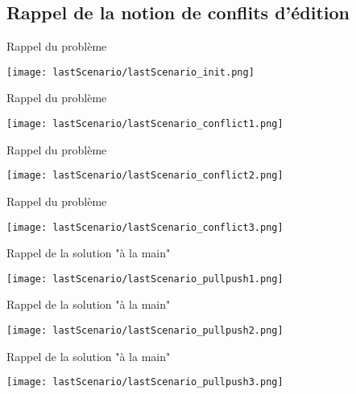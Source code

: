 \documentclass{beamer}
\begin{document}
\subsection{Rappel de la notion de conflits d'édition}
\begin{frame}{Rappel du problème}
\begin{center}
    \texttt{[image: lastScenario/lastScenario\_init.png]}
\end{center}
\end{frame}

\begin{frame}{Rappel du problème}
\begin{center}
    \texttt{[image: lastScenario/lastScenario\_conflict1.png]}
\end{center}
\end{frame}

\begin{frame}{Rappel du problème}
\begin{center}
    \texttt{[image: lastScenario/lastScenario\_conflict2.png]}
\end{center}
\end{frame}

\begin{frame}{Rappel du problème}
\begin{center}
    \texttt{[image: lastScenario/lastScenario\_conflict3.png]}
\end{center}
\end{frame}

\begin{frame}{Rappel de la solution "à la main"}
\begin{center}
    \texttt{[image: lastScenario/lastScenario\_pullpush1.png]}
\end{center}
\end{frame}

\begin{frame}{Rappel de la solution "à la main"}
\begin{center}
    \texttt{[image: lastScenario/lastScenario\_pullpush2.png]}
\end{center}
\end{frame}

\begin{frame}{Rappel de la solution "à la main"}
\begin{center}
    \texttt{[image: lastScenario/lastScenario\_pullpush3.png]}
\end{center}
\end{frame}
\end{document}
